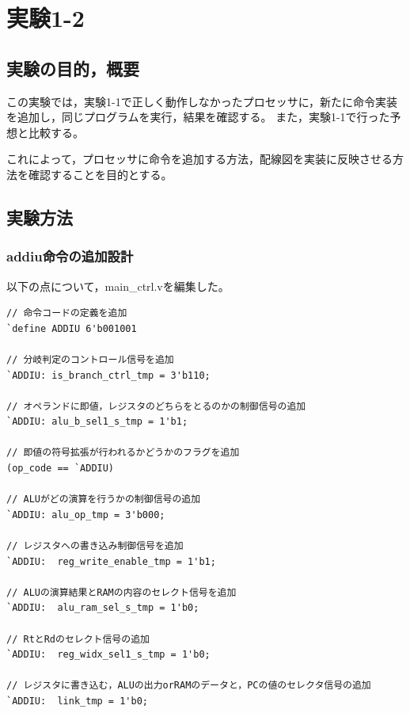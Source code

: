 \section{実験1-2}
\subsection{実験の目的，概要}
この実験では，実験1-1で正しく動作しなかったプロセッサに，新たに命令実装を追加し，同じプログラムを実行，結果を確認する。
また，実験1-1で行った予想と比較する。

これによって，プロセッサに命令を追加する方法，配線図を実装に反映させる方法を確認することを目的とする。

\subsection{実験方法}
\subsubsection{addiu命令の追加設計}
以下の点について，main\_ctrl.vを編集した。
\begin{lstlisting}[caption={addiu命令の追加設計},label={addiu命令の追加設計}]
// 命令コードの定義を追加
`define ADDIU 6'b001001

// 分岐判定のコントロール信号を追加
`ADDIU: is_branch_ctrl_tmp = 3'b110;

// オペランドに即値，レジスタのどちらをとるのかの制御信号の追加
`ADDIU: alu_b_sel1_s_tmp = 1'b1;

// 即値の符号拡張が行われるかどうかのフラグを追加
(op_code == `ADDIU)

// ALUがどの演算を行うかの制御信号の追加
`ADDIU: alu_op_tmp = 3'b000;

// レジスタへの書き込み制御信号を追加
`ADDIU:  reg_write_enable_tmp = 1'b1;

// ALUの演算結果とRAMの内容のセレクト信号を追加
`ADDIU:  alu_ram_sel_s_tmp = 1'b0;

// RtとRdのセレクト信号の追加
`ADDIU:  reg_widx_sel1_s_tmp = 1'b0;

// レジスタに書き込む，ALUの出力orRAMのデータと，PCの値のセレクタ信号の追加
`ADDIU:  link_tmp = 1'b0;

\end{lstlisting}

